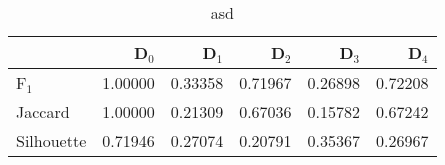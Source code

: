\begin{table}
\centering
\caption{asd}
\label{tab:s1-cont-pivotbi-single}
\begin{tabular}{lrrrrr}
\toprule
{} &   D$_0$ &   D$_1$ &   D$_2$ &   D$_3$ &   D$_4$ \\
\midrule
F$_1$      & 1.00000 & 0.33358 & 0.71967 & 0.26898 & 0.72208 \\
Jaccard    & 1.00000 & 0.21309 & 0.67036 & 0.15782 & 0.67242 \\
Silhouette & 0.71946 & 0.27074 & 0.20791 & 0.35367 & 0.26967 \\
\bottomrule
\end{tabular}
\end{table}
